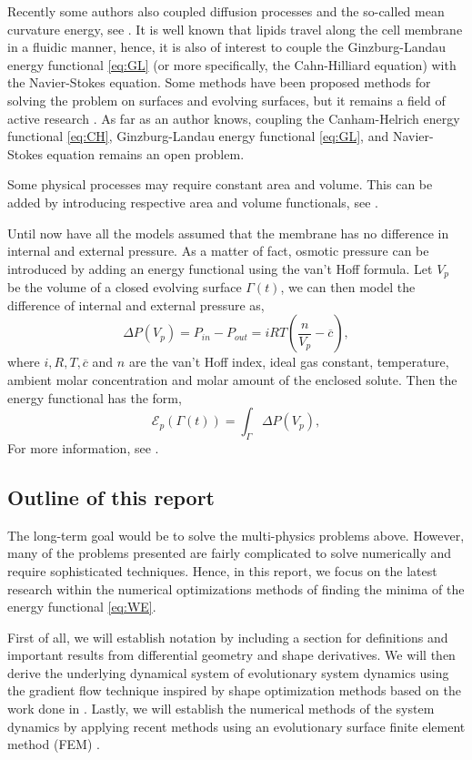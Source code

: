Recently some authors also coupled diffusion processes and the so-called mean curvature energy, see \cite{burger2021interaction, elliott2022numerical}. It is well known that lipids travel
along the cell membrane in a fluidic manner, hence, it is also of interest to couple the Ginzburg-Landau energy functional \eqref{eq:GL} (or more specifically, the Cahn-Hilliard equation) with the Navier-Stokes equation. Some methods have been proposed
methods for solving the problem on surfaces
and evolving surfaces, but it remains a field of active research \cite{olshanskii2022comparison}. As far as an author knows, coupling the Canham-Helrich energy functional \eqref{eq:CH}, Ginzburg-Landau energy functional \eqref{eq:GL},  and Navier-Stokes equation remains an open problem.

Some physical processes may require constant area and volume. This can be added by introducing respective area and volume functionals, see \cite[Definition 2.5]{muller2013volume}.

Until now have all the models assumed that the membrane has no difference in internal and external pressure. As a matter of fact, osmotic pressure can be introduced by adding an energy functional using the van't Hoff formula. Let $V_{p}$ be the volume
of a closed evolving surface $\Gamma \left( t \right) $, we can then model the difference of internal and external pressure as,
\[
\Delta P \left( V_{p} \right) = P_{in} - P_{out} = iRT\left( \frac{n}{V_{p}} - \overline{c}  \right),
\]
where $i, R, T, \overline{c} $ and $n$ are the van't Hoff index, ideal gas constant, temperature, ambient molar concentration and molar amount of the enclosed solute. Then the energy
functional has the form,
\[
\mathcal{E} _{p}\left( \Gamma\left( t \right)     \right)  = \int_{\Gamma   }^{   } \Delta P\left( V_{p} \right) ,
\]
For more information, see \cite{zhu2022mem3dg}.


\subsection{Outline of this report}%
\label{sub:outline_of_this_report}

The long-term goal would be to solve the multi-physics problems above. However, many of the problems presented are fairly complicated to solve numerically and require sophisticated techniques. Hence, in this report, we focus on the latest research within
the numerical optimizations methods of finding the minima of the energy functional \eqref{eq:WE}. 

First of all, we will establish notation by including a section for definitions and important results from differential geometry and shape derivatives. We will then derive the
underlying dynamical system of evolutionary system dynamics using the gradient flow technique inspired by shape optimization methods based on the work done in \cite{ dougan2012first}. Lastly, we will establish the numerical methods of the system
dynamics by applying recent methods using an evolutionary surface finite element method (FEM) \cite{kovacs2021convergent, hu2022evolving}. 



